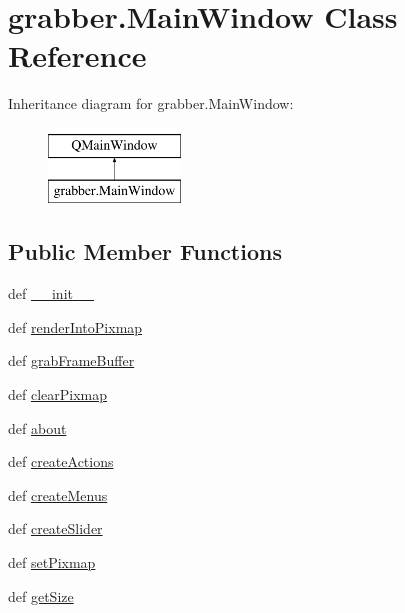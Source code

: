 \hypertarget{classgrabber_1_1MainWindow}{}\section{grabber.\+Main\+Window Class Reference}
\label{classgrabber_1_1MainWindow}
Inheritance diagram for grabber.\+Main\+Window\+:\begin{figure}[H]
\begin{center}
\leavevmode
\includegraphics[height=2.000000cm]{classgrabber_1_1MainWindow}
\end{center}
\end{figure}
\subsection*{Public Member Functions}
\begin{DoxyCompactItemize}
\item 
def \hyperlink{classgrabber_1_1MainWindow_a6cc7dca74ba4ed1815a7b0e08f55fbf3}{\+\_\+\+\_\+init\+\_\+\+\_\+}
\item 
def \hyperlink{classgrabber_1_1MainWindow_a7f0add262e58b34dbf85fe055a4fdf31}{render\+Into\+Pixmap}
\item 
def \hyperlink{classgrabber_1_1MainWindow_a4952d080ef8bb60cdae84d895ab6fd53}{grab\+Frame\+Buffer}
\item 
def \hyperlink{classgrabber_1_1MainWindow_a5f1098848096221f5de279a042857a65}{clear\+Pixmap}
\item 
def \hyperlink{classgrabber_1_1MainWindow_a11a0bbb7bc29c67a43c0c8d8c953b095}{about}
\item 
def \hyperlink{classgrabber_1_1MainWindow_abb3316c9420fc09bc238aed4263ded3b}{create\+Actions}
\item 
def \hyperlink{classgrabber_1_1MainWindow_a7bcef877810023035e80739cf0f119cb}{create\+Menus}
\item 
def \hyperlink{classgrabber_1_1MainWindow_a941d5ca57dde295dacefeaa4662692de}{create\+Slider}
\item 
def \hyperlink{classgrabber_1_1MainWindow_a998110b44a94bbebb961118b4c1cf566}{set\+Pixmap}
\item 
def \hyperlink{classgrabber_1_1MainWindow_a7a88900fe2433912ff0d2714ba69c8ca}{get\+Size}
\end{DoxyCompactItemize}
